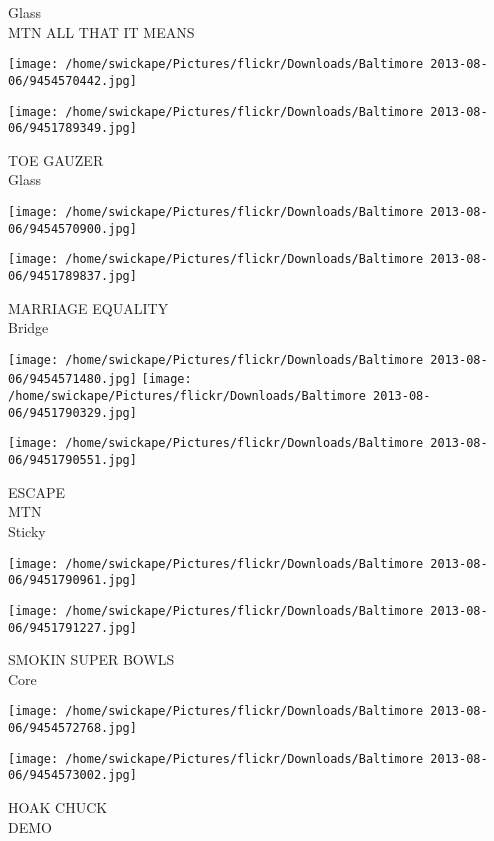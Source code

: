 \documentclass[10pt,letterpaper]{article}
\begin{document}
Glass\\
MTN ALL THAT IT MEANS
\pagebreak

\texttt{[image: /home/swickape/Pictures/flickr/Downloads/Baltimore 2013-08-06/9454570442.jpg]}

\vspace{0.25in}
\texttt{[image: /home/swickape/Pictures/flickr/Downloads/Baltimore 2013-08-06/9451789349.jpg]}

TOE GAUZER\\
Glass
\pagebreak

\texttt{[image: /home/swickape/Pictures/flickr/Downloads/Baltimore 2013-08-06/9454570900.jpg]}

\vspace{0.25in}
\texttt{[image: /home/swickape/Pictures/flickr/Downloads/Baltimore 2013-08-06/9451789837.jpg]}

MARRIAGE EQUALITY\\
Bridge
\pagebreak

\texttt{[image: /home/swickape/Pictures/flickr/Downloads/Baltimore 2013-08-06/9454571480.jpg]}
\texttt{[image: /home/swickape/Pictures/flickr/Downloads/Baltimore 2013-08-06/9451790329.jpg]}

\vspace{0.25in}
\texttt{[image: /home/swickape/Pictures/flickr/Downloads/Baltimore 2013-08-06/9451790551.jpg]}

ESCAPE\\
MTN\\
Sticky
\pagebreak

\texttt{[image: /home/swickape/Pictures/flickr/Downloads/Baltimore 2013-08-06/9451790961.jpg]}

\vspace{0.25in}
\texttt{[image: /home/swickape/Pictures/flickr/Downloads/Baltimore 2013-08-06/9451791227.jpg]}

SMOKIN SUPER BOWLS\\
Core
\pagebreak

\texttt{[image: /home/swickape/Pictures/flickr/Downloads/Baltimore 2013-08-06/9454572768.jpg]}

\vspace{0.25in}
\texttt{[image: /home/swickape/Pictures/flickr/Downloads/Baltimore 2013-08-06/9454573002.jpg]}

HOAK CHUCK\\
DEMO
\pagebreak
\end{document}
